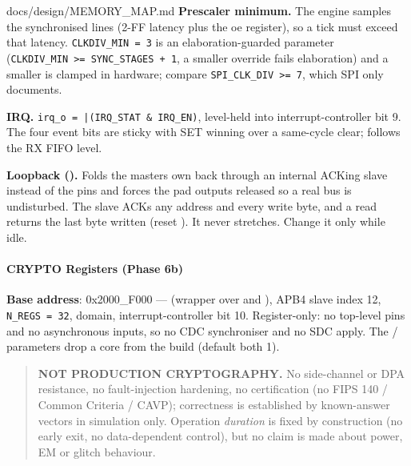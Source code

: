 \begin{relocated}{docs/design/MEMORY_MAP.md}
\textbf{Prescaler minimum.} The engine samples the synchronised lines
(2-FF latency plus the oe register), so a tick must exceed that latency.
\texttt{CLKDIV\_\allowbreak{}MIN\ =\allowbreak{}\ 3} is an
elaboration-guarded parameter
(\texttt{CLKDIV\_\allowbreak{}MIN\ >=\allowbreak{}\ SYNC\_\allowbreak{}STAGES\ +\allowbreak{}\ 1},
a smaller override fails elaboration) and a smaller  is
clamped in hardware; compare
\texttt{SPI\_\allowbreak{}CLK\_\allowbreak{}DIV\ >=\allowbreak{}\ 7},
which SPI only documents.

\textbf{IRQ.}
\texttt{irq\_\allowbreak{}o\ =\allowbreak{}\ |(IRQ\_\allowbreak{}STAT\ \&\ IRQ\_\allowbreak{}EN)},
level-held into interrupt-controller bit 9. The four event bits are
sticky with SET winning over a same-cycle clear; 
follows the RX FIFO level.

\textbf{Loopback ().} Folds the master\textquotesingle s
own  back through an internal ACKing slave instead of the pins
and forces the pad  outputs released so a real bus is
undisturbed. The slave ACKs any address and every write byte, and a read
returns the last byte written (reset ). It never stretches.
Change it only while idle.

\paragraph{CRYPTO Registers (Phase 6b)}\label{ds:mm:memory-map:crypto-registers-phase-6b}

\textbf{Base address}: 0x2000\_\allowbreak{}F000 ---
 (wrapper over  and
), APB4 slave index 12,
\texttt{N\_\allowbreak{}REGS\ =\allowbreak{}\ 32}, 
domain, interrupt-controller bit 10. Register-only: no top-level pins
and no asynchronous inputs, so no CDC synchroniser and no SDC
 apply. The  / 
parameters drop a core from the build (default both 1).

\begin{quote}
\textbf{NOT PRODUCTION CRYPTOGRAPHY.} No side-channel or DPA resistance,
no fault-injection hardening, no certification (no FIPS 140 / Common
Criteria / CAVP); correctness is established by known-answer vectors in
simulation only. Operation \emph{duration} is fixed by construction (no
early exit, no data-dependent control), but no claim is made about
power, EM or glitch behaviour.


\end{quote}
\end{relocated}
